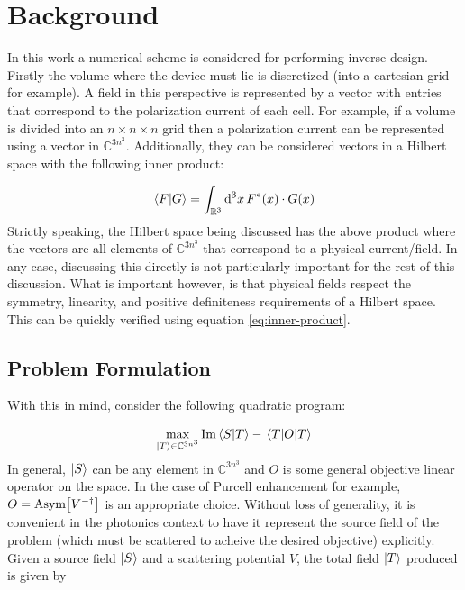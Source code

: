 \documentclass[reprint]{revtex4-2}
\newcommand{\asym}[1]{\text{Asym}\qty[#1]}
\begin{document}
\section{Background}
\label{sec:background}

In this work a numerical scheme is considered for performing inverse design. Firstly the volume where the device must lie is discretized (into a cartesian grid for example). A field in this perspective is represented by a vector with entries that correspond to the polarization current of each cell. For example, if a volume is divided into an $n\times n\times n$ grid then a polarization current can be represented using a vector in $\mathbb{C}^{3n^3}$. Additionally, they can be considered vectors in a Hilbert space with the following inner product:

\begin{align}
	\braket{F}{G} = \int_{\mathbb{R}^3} \dd[3]{x} F^*(x)\cdot G(x)
	\label{eq:inner-product}
\end{align}
Strictly speaking, the Hilbert space being discussed has the above product where the vectors are all elements of $\mathbb{C}^{3n^3}$ that correspond to a physical current/field. In any case, discussing this directly is not particularly important for the rest of this discussion. What is important however, is that physical fields respect the symmetry, linearity, and positive definiteness requirements of a Hilbert space. This can be quickly verified using equation \ref{eq:inner-product}.

\subsection{Problem Formulation}
\label{ssec:formulation}
With this in mind, consider the following quadratic program:

\begin{align}
	\max_{\ket{T}\in\mathbb{C}^{3n^3}} \Im\braket{S}{T} - \ev{O}{T}
\end{align}
In general, $\ket{S}$ can be any element in $\mathbb{C}^{3n^3}$ and $O$ is some general objective linear operator on the space. In the case of Purcell enhancement for example, $O=\asym{V^{-\dagger}}$ is an appropriate choice. Without loss of generality, it is convenient in the photonics context to have it represent the source field of the problem (which must be scattered to acheive the desired objective) explicitly. Given a source field $\ket{S}$ and a scattering potential $V$, the total field $\ket{T}$ produced is given by
\end{document}
